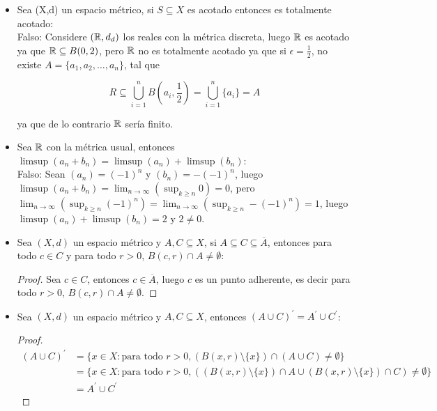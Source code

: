 \begin{itemize}[label={☠},leftmargin=*]

\item Sea (X,d) un espacio métrico, si $S\subseteq X$ es acotado entonces es totalmente acotado:\\

Falso: Considere $(\mathbb{R},d_d)$ los reales con la métrica discreta, luego $\mathbb{R}$ es acotado ya que $\mathbb{R}\subseteq B(0,2)$, pero $\mathbb{R}$ no es totalmente acotado ya que si $\epsilon=\frac{1}{2}$, no existe $A=\{a_1,a_2,\ldots,a_n\}$, tal que 

$$R\subseteq \bigcup_{i=1}^nB\left(a_i,\frac{1}{2}\right)=\bigcup_{i=1}^n\{a_i\} 
    =A 
    $$

    ya que de lo contrario $\mathbb{R}$ sería finito.


\item Sea $\mathbb{R}$ con la métrica usual, entonces $\limsup(a_n+b_n)=\limsup(a_n)+\limsup(b_n)$:\\

Falso: Sean $(a_n)=(-1)^n$ y $(b_n)=-(-1)^n$, luego $\limsup(a_n+b_n)=\lim _{n \rightarrow \infty}\left(\sup _{k \geq n} 0\right)=0$, pero $\lim _{n \rightarrow \infty}\left(\sup _{k \geq n} (-1)^n\right)=\lim _{n \rightarrow \infty}\left(\sup _{k \geq n} -(-1)^n\right)=1$, luego $\limsup(a_n)+\limsup(b_n)=2$ y $2\neq 0$.

\item Sea $(X,d)$ un espacio métrico y $A,C\subseteq X$, si $A\subseteq C\subseteq \overline{A}$, entonces para todo $c\in C$ y para todo $r>0$, $B(c,r)\cap A\neq \emptyset$:\\

\begin{proof}
Sea $c\in C$, entonces $c\in \overline{A}$, luego $c$ es un punto adherente, es decir para todo $r>0$, $B(c,r)\cap A\neq \emptyset$.
\end{proof}

\item Sea $(X,d)$ un espacio métrico y $A,C\subseteq X$, entonces $(A\cup C)^{\prime}=A^{\prime}\cup C^{\prime}$:\\

\begin{proof}

\begin{align*}
(A\cup C)^{\prime}&=\{x\in X: \text{para todo }r>0, (B(x,r)\setminus \{x\})\cap (A\cup C)\neq \emptyset\}\\
&=\{x\in X: \text{para todo }r>0, ((B(x,r)\setminus \{x\})\cap A \cup (B(x,r)\setminus \{x\})\cap C) \neq \emptyset\}\\
&=A^{\prime}\cup C^{\prime}
\end{align*}


\end{proof}
\end{itemize}
